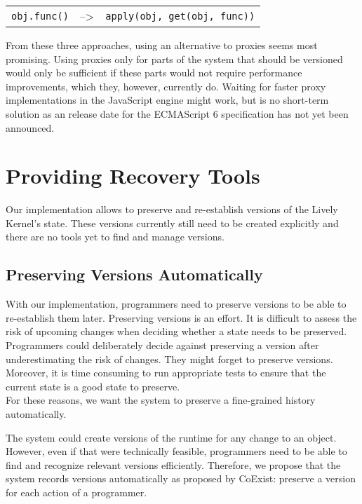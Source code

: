 \begin{center}
    \begin{tabular}{ lll }
    \lstinline|obj.func()| & --> & \lstinline|apply(obj, get(obj, func))| \\
    \end{tabular}
\end{center}

From these three approaches, using an alternative to proxies seems most promising.
Using proxies only for parts of the system that should be versioned would only be sufficient if these parts would not require performance improvements, which they, however, currently do.
Waiting for faster proxy implementations in the JavaScript engine might work, but is no short-term solution as an release date for the ECMAScript 6 specification has not yet been announced.



\section{Providing Recovery Tools}

Our implementation allows to preserve and re-establish versions of the Lively Kernel's state.
These versions currently still need to be created explicitly and there are no tools yet to find and manage versions.


\subsection{Preserving Versions Automatically}

With our implementation, programmers need to preserve versions to be able to re-establish them later.
Preserving versions is an effort.
It is difficult to assess the risk of upcoming changes when deciding whether a state needs to be preserved.
Programmers could deliberately decide against preserving a version after underestimating the risk of changes.
They might forget to preserve versions.
Moreover, it is time consuming to run appropriate tests to ensure that the current state is a good state to preserve.\\
For these reasons, we want the system to preserve a fine-grained history automatically.

The system could create versions of the runtime for any change to an object.
However, even if that were technically feasible, programmers need to be able to find and recognize relevant versions efficiently.
Therefore, we propose that the system records versions automatically as proposed by CoExist: preserve a version for each action of a programmer.

